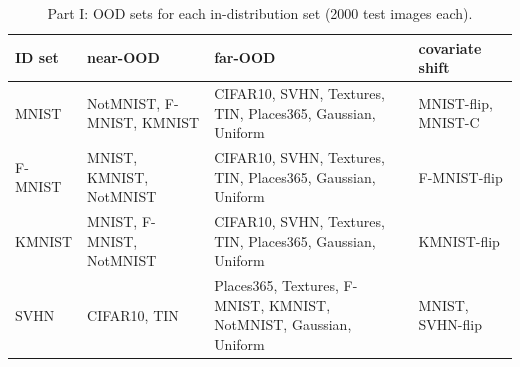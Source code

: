\begin{table}[t]
\centering\small
\begin{tabular}{@{}l>{\raggedright}p{3.4cm}>{\raggedright}p{6.2cm}p{3.2cm}@{}}
\toprule
ID set & near-OOD & far-OOD & covariate shift \\
\midrule
MNIST & NotMNIST, F-MNIST, KMNIST & CIFAR10, SVHN, Textures, TIN, Places365, Gaussian, Uniform & MNIST-flip, MNIST-C \tabularnewline
F-MNIST & MNIST, KMNIST, NotMNIST & CIFAR10, SVHN, Textures, TIN, Places365, Gaussian, Uniform & F-MNIST-flip \tabularnewline
KMNIST & MNIST, F-MNIST, NotMNIST & CIFAR10, SVHN, Textures, TIN, Places365, Gaussian, Uniform & KMNIST-flip \tabularnewline
SVHN & CIFAR10, TIN & Places365, Textures, F-MNIST, KMNIST, NotMNIST, Gaussian, Uniform & MNIST, SVHN-flip \tabularnewline
\bottomrule
\end{tabular}
\caption{Part I: OOD sets for each in-distribution set (2000 test images each).}
\label{tab:p1-sets}
\end{table}
